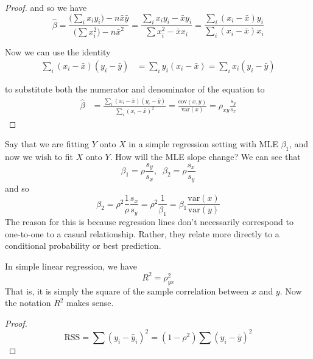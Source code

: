 \begin{proof}
    and so we have 
    \begin{equation}
      \hat{\beta} = \frac{ \big( \sum_i x_i y_i \big) - n \bar{x}\bar{y}}{\big( \sum x_i^2 \big) - n \bar{x}^2} = \frac{ \sum_i x_i y_i - \bar{x} y_i}{\sum x_i^2 - \bar{x} x_i} = \frac{ \sum_i (x_i - \bar{x}) y_i}{\sum_i (x_i - \bar{x}) x_i}
    \end{equation}

    Now we can use the identity
    \begin{align}
      \sum_{i} (x_i - \bar{x}) (y_i - \bar{y}) & = \sum_i y_i (x_i - \bar{x}) = \sum_i x_i (y_i - \bar{y}) 
    \end{align}

    to substitute both the numerator and denominator of the equation to 
    \begin{align}
      \hat{\beta} & = \frac{\sum_i (x_i - \bar{x}) (y_i - \bar{y})}{\sum_i (x_i - \bar{x})^2} = \frac{\mathrm{cov}(x, y)}{\mathrm{var}(x)} = \rho_{xy} \frac{s_y}{s_x}
    \end{align}
  \end{proof}

  \begin{example}
    Say that we are fitting $Y$ onto $X$ in a simple regression setting with MLE $\beta_1$, and now we wish to fit $X$ onto $Y$. How will the MLE slope change? We can see that 
    \[\beta_1 = \rho \frac{s_y}{s_x} , \;\; \beta_2 = \rho \frac{s_x}{s_y}\]
    and so 
    \[\beta_2 = \rho^2 \frac{1}{\rho} \frac{s_x}{s_y} = \rho^2 \frac{1}{\beta_1} = \beta_1 \frac{\mathrm{var}(x)}{\mathrm{var}(y)}\]
    The reason for this is because regression lines don't necessarily correspond to one-to-one to a casual relationship. Rather, they relate more directly to a conditional probability or best prediction. 
  \end{example}

  \begin{theorem}
    In simple linear regression, we have 
    \begin{equation}
      R^2 = \rho_{yx}^2
    \end{equation}
    That is, it is simply the square of the sample correlation between $x$ and $y$. Now the notation $R^2$ makes sense. 
  \end{theorem}
  \begin{proof}
    \begin{equation}
      \mathrm{RSS} = \sum (y_i - \hat{y}_i)^2 = (1 - \rho^2) \sum (y_i - \bar{y})^2 
    \end{equation}
  \end{proof}

